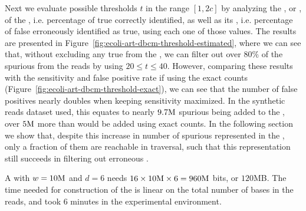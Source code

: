 Next we evaluate possible thresholds $t$ in the range $[1, 2c]$ by analyzing the , or , of the \dBCM, i.e. percentage of true  correctly identified, as well as its , i.e. percentage of false  erroneously identified as true, using each one of those values. The results are presented in Figure~\ref{fig:ecoli-art-dbcm-threshold-estimated}, where we can see that, without excluding any true  from the \dBG, we can filter out over $80\%$ of the spurious  from the reads by using $20 \leq t \leq 40$. However, comparing these results with the sensitivity and false positive rate if using the exact counts (Figure~\ref{fig:ecoli-art-dbcm-threshold-exact}), we can see that the number of false positives nearly doubles when keeping sensitivity maximized. In the synthetic reads dataset used, this equates to nearly $9.7\mega$ spurious  being added to the \dBG, over $5\mega$ more than would be added using exact counts. In the following section we show that, despite this increase in number of spurious  represented in the \dBCM, only a fraction of them are reachable in traversal, such that this representation still succeeds in filtering out erroneous .

A \dBCM with $w = 10\mega$ and $d = 6$ needs $16 \times 10\mega \times 6 = 960\mega$ bits, or $120$MB. The time needed for construction of the \dBCM is linear on the total number of bases in the reads, and took $6$ minutes in the experimental environment.

